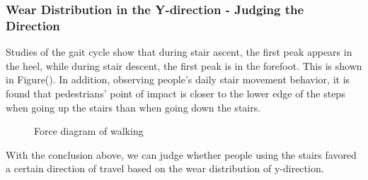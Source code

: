 \documentclass[12pt]{article}  %
\numberwithin{equation}{section} %
\begin{document}
\subsubsection{Wear Distribution in the Y-direction - Judging the Direction}
Studies of the gait cycle show that during stair ascent, the first peak appears in the heel, while during stair descent, the first peak is in the forefoot. This is shown in Figure(). In addition, observing people's daily stair movement behavior, it is found that pedestrians' point of impact is closer to the lower edge of the steps when going up the stairs than when going down the stairs. 
\begin{figure}[H]
\vspace{-1.0em}
	\centering    
	\caption{Force diagram of walking}		%
	\label{fig:ForceDiagram}									%
    \vspace{-1.0em}
\end{figure}

With the conclusion above, we can judge whether people using the stairs favored a certain direction of travel based on the wear distribution of y-direction. 
\end{document}
